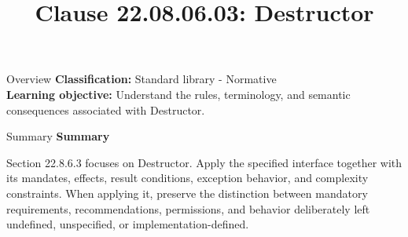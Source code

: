 \documentclass[10pt,letterpaper]{article}
\title{Clause 22.08.06.03: Destructor}
\author{}
\date{}
\begin{document}
\maketitle
\begin{CornellOverviewBox}{Overview}
\textbf{Classification:} Standard library - Normative\\[2pt]
\textbf{Learning objective:} Understand the rules, terminology, and semantic consequences associated with Destructor.
\end{CornellOverviewBox}\begin{CornellSummaryBox}{Summary}
{\sffamily\bfseries\color{Accent} Summary}\par\vspace{3pt}Section 22.8.6.3 focuses on Destructor. Apply the specified interface together with its mandates, effects, result conditions, exception behavior, and complexity constraints. When applying it, preserve the distinction between mandatory requirements, recommendations, permissions, and behavior deliberately left undefined, unspecified, or implementation-defined.
\end{CornellSummaryBox}
\end{document}
